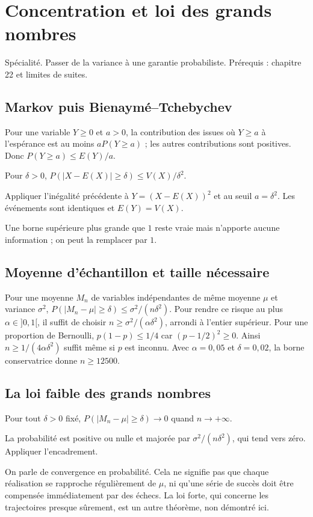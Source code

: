 \documentclass[../cours_tle.tex]{subfiles}
\begin{document}
\setcounter{chapter}{22}
\chapter{Concentration et loi des grands nombres}
\label{ch:23}
\begin{objectif}
Spécialité. Passer de la variance à une garantie probabiliste. Prérequis : chapitre 22 et limites de suites.
\end{objectif}
\section{Markov puis Bienaymé--Tchebychev}
Pour une variable $Y\ge0$ et $a>0$, la contribution des issues où $Y\ge a$ à l'espérance est au moins $aP(Y\ge a)$ ; les autres contributions sont positives. Donc $P(Y\ge a)\le E(Y)/a$.
\begin{theoreme}
Pour $\delta>0$, $P(|X-E(X)|\ge\delta)\le V(X)/\delta^2$.
\end{theoreme}
\begin{demonstration}
Appliquer l'inégalité précédente à $Y=(X-E(X))^2$ et au seuil $a=\delta^2$. Les événements sont identiques et $E(Y)=V(X)$.
\end{demonstration}
Une borne supérieure plus grande que $1$ reste vraie mais n'apporte aucune information ; on peut la remplacer par $1$.
\section{Moyenne d'échantillon et taille nécessaire}
Pour une moyenne $M_n$ de variables indépendantes de même moyenne $\mu$ et variance $\sigma^2$,
$P(|M_n-\mu|\ge\delta)\le\sigma^2/(n\delta^2)$.
Pour rendre ce risque au plus $\alpha\in]0,1[$, il suffit de choisir
$n\ge\sigma^2/(\alpha\delta^2)$, arrondi à l'entier supérieur.
Pour une proportion de Bernoulli, $p(1-p)\le1/4$ car $(p-1/2)^2\ge0$.
Ainsi $n\ge1/(4\alpha\delta^2)$ suffit même si $p$ est inconnu.
Avec $\alpha=0{,}05$ et $\delta=0{,}02$, la borne conservatrice donne $n\ge12500$.
\section{La loi faible des grands nombres}
\begin{theoreme}
Pour tout $\delta>0$ fixé, $P(|M_n-\mu|\ge\delta)\to0$ quand $n\to+\infty$.
\end{theoreme}
\begin{demonstration}
La probabilité est positive ou nulle et majorée par $\sigma^2/(n\delta^2)$, qui tend vers zéro. Appliquer l'encadrement.
\end{demonstration}
On parle de convergence en probabilité. Cela ne signifie pas que chaque réalisation se rapproche régulièrement de $\mu$, ni qu'une série de succès doit être compensée immédiatement par des échecs. La loi forte, qui concerne les trajectoires presque sûrement, est un autre théorème, non démontré ici.
\end{document}

